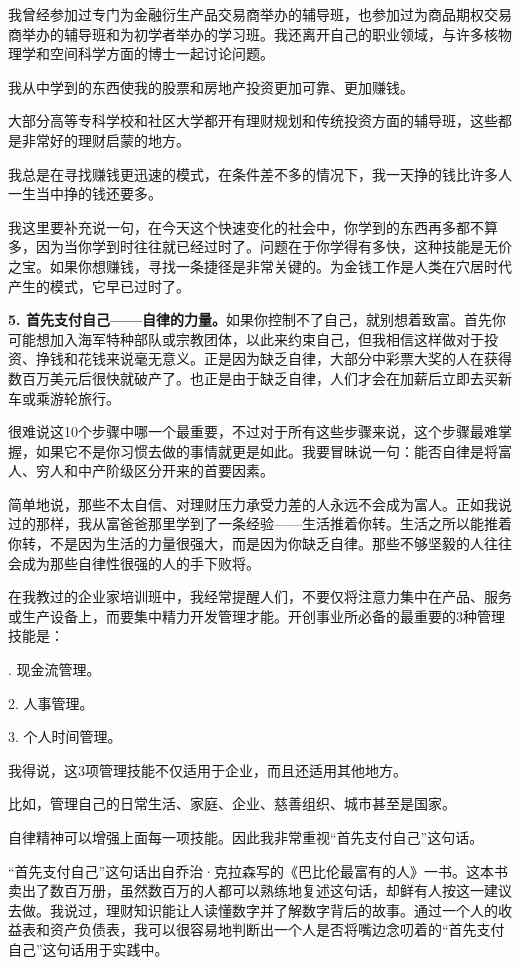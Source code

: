 我曾经参加过专门为金融衍生产品交易商举办的辅导班，也参加过为商品期权交易商举办的辅导班和为初学者举办的学习班。我还离开自己的职业领域，与许多核物理学和空间科学方面的博士一起讨论问题。

我从中学到的东西使我的股票和房地产投资更加可靠、更加赚钱。

大部分高等专科学校和社区大学都开有理财规划和传统投资方面的辅导班，这些都是非常好的理财启蒙的地方。

我总是在寻找赚钱更迅速的模式，在条件差不多的情况下，我一天挣的钱比许多人一生当中挣的钱还要多。

我这里要补充说一句，在今天这个快速变化的社会中，你学到的东西再多都不算多，因为当你学到时往往就已经过时了。问题在于你学得有多快，这种技能是无价之宝。如果你想赚钱，寻找一条捷径是非常关键的。为金钱工作是人类在穴居时代产生的模式，它早已过时了。

\textbf{5. 首先支付自己——自律的力量。}如果你控制不了自己，就别想着致富。首先你可能想加入海军特种部队或宗教团体，以此来约束自己，但我相信这样做对于投资、挣钱和花钱来说毫无意义。正是因为缺乏自律，大部分中彩票大奖的人在获得数百万美元后很快就破产了。也正是由于缺乏自律，人们才会在加薪后立即去买新车或乘游轮旅行。

很难说这10个步骤中哪一个最重要，不过对于所有这些步骤来说，这个步骤最难掌握，如果它不是你习惯去做的事情就更是如此。我要冒昧说一句：能否自律是将富人、穷人和中产阶级区分开来的首要因素。

简单地说，那些不太自信、对理财压力承受力差的人永远不会成为富人。正如我说过的那样，我从富爸爸那里学到了一条经验——生活推着你转。生活之所以能推着你转，不是因为生活的力量很强大，而是因为你缺乏自律。那些不够坚毅的人往往会成为那些自律性很强的人的手下败将。

在我教过的企业家培训班中，我经常提醒人们，不要仅将注意力集中在产品、服务或生产设备上，而要集中精力开发管理才能。开创事业所必备的最重要的3种管理技能是：

{. 现金流管理。

2. 人事管理。

3. 个人时间管理。}

我得说，这3项管理技能不仅适用于企业，而且还适用其他地方。

比如，管理自己的日常生活、家庭、企业、慈善组织、城市甚至是国家。

自律精神可以增强上面每一项技能。因此我非常重视“首先支付自己”这句话。

“首先支付自己”这句话出自乔治·克拉森写的《巴比伦最富有的人》一书。这本书卖出了数百万册，虽然数百万的人都可以熟练地复述这句话，却鲜有人按这一建议去做。我说过，理财知识能让人读懂数字并了解数字背后的故事。通过一个人的收益表和资产负债表，我可以很容易地判断出一个人是否将嘴边念叨着的“首先支付自己”这句话用于实践中。

